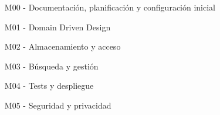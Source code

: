 \begin{enumerate}
    \item [M00] - Documentación, planificación y configuración inicial
    \item [M01] - Domain Driven Design
    \item [M02] - Almacenamiento y acceso
    \item [M03] - Búsqueda y gestión
    \item [M04] - Tests y despliegue
    \item [M05] - Seguridad y privacidad
\end{enumerate}